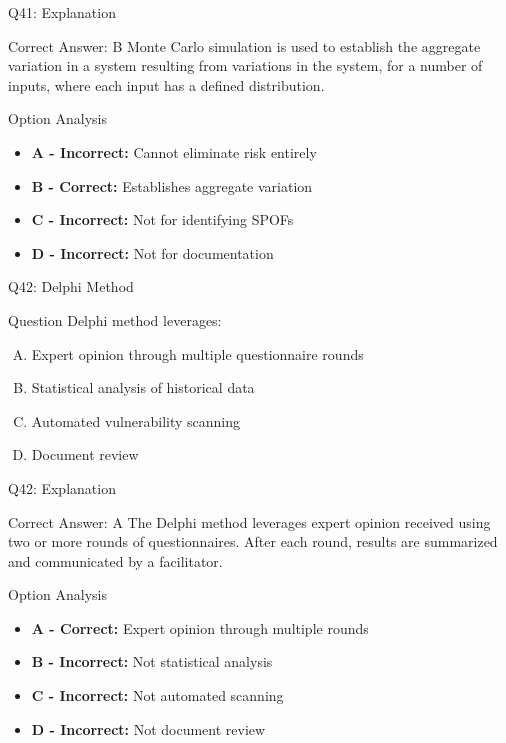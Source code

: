 \documentclass{beamer}
\begin{document}
	\begin{frame}{Q41: Explanation}
		\begin{block}{Correct Answer: B}
			Monte Carlo simulation is used to establish the aggregate variation in a system resulting from variations in the system, for a number of inputs, where each input has a defined distribution.
		\end{block}
		\begin{block}{Option Analysis}
			\begin{itemize}
				\item \textbf{A - Incorrect:} Cannot eliminate risk entirely
				\item \textbf{B - Correct:} Establishes aggregate variation
				\item \textbf{C - Incorrect:} Not for identifying SPOFs
				\item \textbf{D - Incorrect:} Not for documentation
			\end{itemize}
		\end{block}
	\end{frame}
	
	\begin{frame}{Q42: Delphi Method}
		\begin{block}{Question}
			Delphi method leverages:
		\end{block}
		\begin{enumerate}[(A)]
			\item Expert opinion through multiple questionnaire rounds
			\item Statistical analysis of historical data
			\item Automated vulnerability scanning
			\item Document review
		\end{enumerate}
	\end{frame}
	
	\begin{frame}{Q42: Explanation}
		\begin{block}{Correct Answer: A}
			The Delphi method leverages expert opinion received using two or more rounds of questionnaires. After each round, results are summarized and communicated by a facilitator.
		\end{block}
		\begin{block}{Option Analysis}
			\begin{itemize}
				\item \textbf{A - Correct:} Expert opinion through multiple rounds
				\item \textbf{B - Incorrect:} Not statistical analysis
				\item \textbf{C - Incorrect:} Not automated scanning
				\item \textbf{D - Incorrect:} Not document review
			\end{itemize}
		\end{block}
	\end{frame}
	
\end{document}
